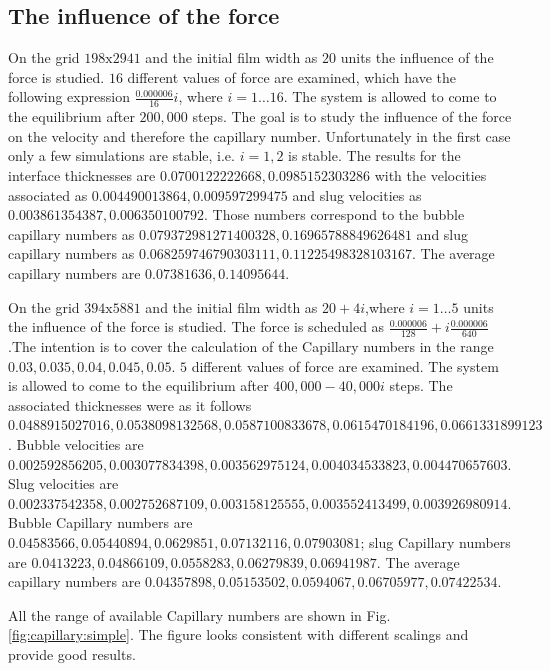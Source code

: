 \documentclass{article}
\begin{document}
\subsection{The influence of the force}
\begin{description}
 \item 
On the grid $198\mathrm{x}2941$ and the initial film width as $20$ units
the
influence of the force is studied. $16$ different values of force are examined,
which have the following expression $\frac{0.000006}{16} i$, where $i=1 \dots
16$. The system is allowed to come to the equilibrium after $200,000$ steps. The
goal is to study the influence of the force on the velocity and therefore the
capillary number. Unfortunately in the first case only a few simulations are
stable, i.e.
$i=1,2$ is stable. The results for the interface thicknesses are
$0.0700122222668,0.0985152303286$ with the velocities associated as
$0.004490013864,0.009597299475$ and slug velocities as
$0.003861354387,0.006350100792$. Those numbers correspond to the bubble
capillary numbers as $0.079372981271400328, 0.16965788849626481$ and slug
capillary numbers as $0.068259746790303111, 0.11225498328103167$. The average
capillary numbers are $0.07381636,0.14095644$. 

\item
On the grid $394\mathrm{x}5881$ and the initial film width as $20+4 i$,where
$i=1 \dots 5$ units the
influence of the force is studied. The force is scheduled as
$\frac{0.000006}{128}+i \frac{0.000006}{640}$.The intention is to cover the
calculation of the Capillary numbers in the range $0.03,0.035,0.04,0.045,0.05$. 
$5$ different values of force are examined. The system is allowed to come to the
equilibrium after $400,000-40,000 i$ steps. The associated thicknesses were as
it follows
$0.0488915027016,0.0538098132568,0.0587100833678,0.0615470184196,
0.0661331899123$. Bubble velocities are
$0.002592856205,0.003077834398,0.003562975124,0.004034533823,0.004470657603$.
Slug velocities are
$0.002337542358,0.002752687109,0.003158125555,0.003552413499,0.003926980914$.
Bubble Capillary numbers are $0.04583566,  0.05440894,  0.0629851 , 
0.07132116, 0.07903081$; slug Capillary numbers are $0.0413223 ,  0.04866109, 
0.0558283, 0.06279839, 0.06941987$. The average capillary numbers are
$0.04357898, 0.05153502, 0.0594067, 0.06705977, 0.07422534$.
\end{description}

All the range of available Capillary numbers are shown in Fig.
\ref{fig:capillary:simple}. The figure looks consistent with different
scalings and provide good results.
\end{document}
